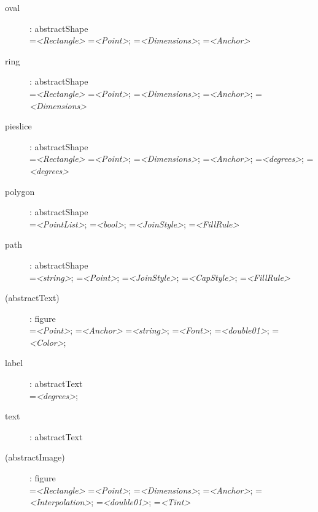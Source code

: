 \begin{flushleft}
\begin{description}
\item[oval]: abstractShape \\
    =\textit{<Rectangle>}
    =\textit{<Point>};
    =\textit{<Dimensions>};
    =\textit{<Anchor>}

\item[ring]: abstractShape \\
    =\textit{<Rectangle>}
    =\textit{<Point>};
    =\textit{<Dimensions>};
    =\textit{<Anchor>};
    =\textit{<Dimensions>}

\item[pieslice]: abstractShape \\
    =\textit{<Rectangle>}
    =\textit{<Point>};
    =\textit{<Dimensions>};
    =\textit{<Anchor>};
    =\textit{<degrees>};
    =\textit{<degrees>}

\item[polygon]: abstractShape \\
    =\textit{<PointList>};
    =\textit{<bool>};
    =\textit{<JoinStyle>};
    =\textit{<FillRule>}

\item[path]: abstractShape \\
    =\textit{<string>};
    =\textit{<Point>};
    =\textit{<JoinStyle>};
    =\textit{<CapStyle>};
    =\textit{<FillRule>}

\item[(abstractText)]: figure \\
    =\textit{<Point>};
    =\textit{<Anchor>}
    =\textit{<string>};
    =\textit{<Font>};
    =\textit{<double01>};
    =\textit{<Color>};

\item[label]: abstractText \\
    =\textit{<degrees>};

\item[text]: abstractText

\item[(abstractImage)]: figure \\
    =\textit{<Rectangle>}
    =\textit{<Point>};
    =\textit{<Dimensions>};
    =\textit{<Anchor>};
    =\textit{<Interpolation>};
    =\textit{<double01>};
    =\textit{<Tint>}


\end{description}
\end{flushleft}

